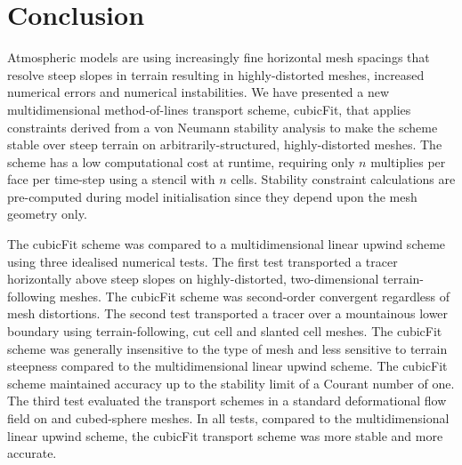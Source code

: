 \section{Conclusion}
\label{sec:conclusion}

Atmospheric models are using increasingly fine horizontal mesh spacings that resolve steep slopes in terrain resulting in highly-distorted meshes, increased numerical errors and numerical instabilities.
We have presented a new multidimensional method-of-lines transport scheme, cubicFit, that applies constraints derived from a von Neumann stability analysis to make the scheme stable over steep terrain on arbitrarily-structured, highly-distorted meshes.
The scheme has a low computational cost at runtime, requiring only $n$ multiplies per face per time-step using a stencil with $n$ cells.  Stability constraint calculations are pre-computed during model initialisation since they depend upon the mesh geometry only.

The cubicFit scheme was compared to a multidimensional linear upwind scheme using three idealised numerical tests.
The first test transported a tracer horizontally above steep slopes on highly-distorted, two-dimensional terrain-following meshes.  The cubicFit scheme was second-order convergent regardless of mesh distortions.
The second test transported a tracer over a mountainous lower boundary using terrain-following, cut cell and slanted cell meshes.
The cubicFit scheme was generally insensitive to the type of mesh and less sensitive to terrain steepness compared to the multidimensional linear upwind scheme.
The cubicFit scheme maintained accuracy up to the stability limit of a Courant number of one.
The third test evaluated the transport schemes in a standard deformational flow field on  and cubed-sphere meshes.
In all tests, compared to the multidimensional linear upwind scheme, the cubicFit transport scheme was more stable and more accurate.

